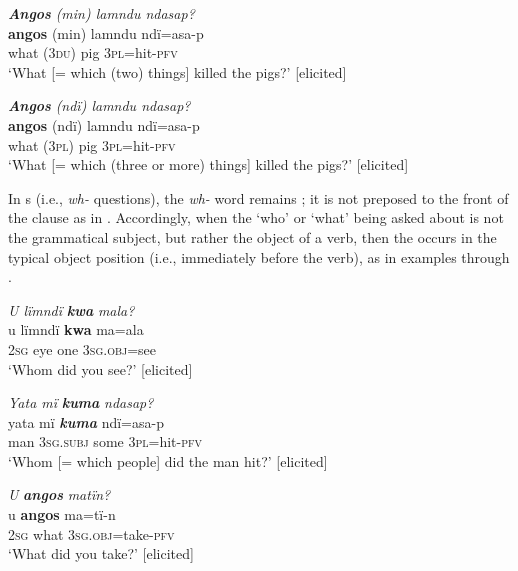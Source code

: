 \ea%
    \label{ex:pron:55}
          \textbf{\textit{Angos}} \textit{(min) lamndu ndasap?}\\
\gll \textbf{angos}  (min)  lamndu  ndï=asa-p\\
    what  (3\textsc{du)}  pig      \textsc{3pl=}hit-\textsc{pfv}\\
\glt `What [= which (two) things] killed the pigs?’ [elicited]
\z

\ea%
    \label{ex:pron:56}
          \textbf{\textit{Angos}} \textit{(ndï) lamndu ndasap?}\\
\gll    \textbf{angos}  (ndï)  lamndu  ndï=asa-p\\
    what  (3\textsc{pl)}  pig      \textsc{3pl=}hit-\textsc{pfv}\\
\glt `What [= which (three or more) things] killed the pigs?’ [elicited]
\z


In s (i.e., \textit{wh-} questions), the \textit{wh-} word remains ; it is not preposed to the front of the clause as in . Accordingly, when the ‘who’ or ‘what’ being asked about is not the grammatical subject, but rather the object of a verb, then the   occurs in the typical object position (i.e., immediately before the verb), as in examples  through .

\ea%
    \label{ex:pron:57}
         \textit{U lïmndï} \textbf{\textit{kwa}} \textit{mala?}\\
\gll u    lïmndï  \textbf{kwa}  ma=ala\\
    2\textsc{sg}  eye    one    \textsc{3sg.obj}=see\\
\glt `Whom did you see?’   [elicited]
\z

\ea%
    \label{ex:pron:58}
          \textit{Yata mï} \textbf{\textit{kuma}} \textit{ndasap?}\\
\gll yata  mï \textbf{\textit{kuma}} ndï=asa-p\\
    man  \textsc{3sg.subj}  some  \textsc{3pl=}hit-\textsc{pfv}\\
\glt `Whom [= which people] did the man hit?’ [elicited]
\z

\ea%
    \label{ex:pron:59}
          \textit{U} \textbf{\textit{angos}} \textit{matïn?}\\
\gll u    \textbf{angos}  ma=tï-n\\
    \textsc{2sg}  what  \textsc{3sg.obj=}take-\textsc{pfv}\\
\glt `What did you take?’ [elicited]
\z

